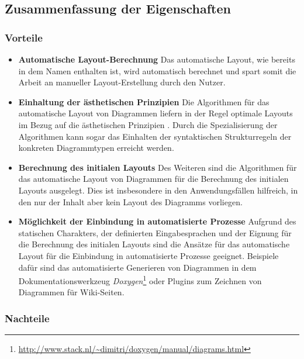 \subsection{Zusammenfassung der Eigenschaften}
\label{subsec:summary-automatic-layout}

\subsubsection{Vorteile}

\begin{itemize}

\item
\textbf{Automatische Layout-Berechnung}
Das automatische Layout, wie bereits in dem Namen enthalten ist, wird automatisch berechnet und spart somit die Arbeit an manueller Layout-Erstellung durch den Nutzer. 

\item
\textbf{Einhaltung der ästhetischen Prinzipien}
Die Algorithmen für das automatische Layout von Diagrammen liefern in der Regel optimale Layouts im Bezug auf die ästhetischen Prinzipien \cite{Maier12A-Pattern-based}. Durch die Spezialisierung der Algorithmen kann sogar das Einhalten der syntaktischen Strukturregeln der konkreten Diagrammtypen erreicht werden.

\item
\textbf{Berechnung des initialen Layouts}
Des Weiteren sind die Algorithmen für das automatische Layout von Diagrammen für die Berechnung des initialen Layouts ausgelegt. Dies ist insbesondere in den Anwendungsfällen hilfreich, in den nur der Inhalt aber kein Layout des Diagramms vorliegen.

\item
\textbf{Möglichkeit der Einbindung in automatisierte Prozesse}
Aufgrund des statischen Charakters, der definierten Eingabesprachen und der Eignung für die Berechnung des initialen Layouts sind die Ansätze für das automatische Layout für die Einbindung in automatisierte Prozesse geeignet. Beispiele dafür sind das automatisierte Generieren von Diagrammen in dem Dokumentationswerkzeug \textit{Doxygen}\footnote{\url{http://www.stack.nl/~dimitri/doxygen/manual/diagrams.html}} oder Plugins zum Zeichnen von Diagrammen für Wiki-Seiten.

\end{itemize}

\subsubsection{Nachteile}

